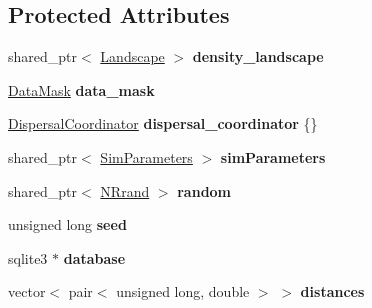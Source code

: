 \subsection*{Protected Attributes}
\begin{DoxyCompactItemize}
\item 
shared\+\_\+ptr$<$ \hyperlink{class_landscape}{Landscape} $>$ {\bfseries density\+\_\+landscape}\hypertarget{class_simulate_dispersal_af69dbb932efef10441d1acf219416c0f}{}\label{class_simulate_dispersal_af69dbb932efef10441d1acf219416c0f}

\item 
\hyperlink{class_data_mask}{Data\+Mask} {\bfseries data\+\_\+mask}\hypertarget{class_simulate_dispersal_a99b4ca8cf3ecbaad85a22c41e5a97a77}{}\label{class_simulate_dispersal_a99b4ca8cf3ecbaad85a22c41e5a97a77}

\item 
\hyperlink{class_dispersal_coordinator}{Dispersal\+Coordinator} {\bfseries dispersal\+\_\+coordinator} \{\}\hypertarget{class_simulate_dispersal_a55da369d57d854168ff6e851b0d7892a}{}\label{class_simulate_dispersal_a55da369d57d854168ff6e851b0d7892a}

\item 
shared\+\_\+ptr$<$ \hyperlink{struct_sim_parameters}{Sim\+Parameters} $>$ {\bfseries sim\+Parameters}\hypertarget{class_simulate_dispersal_abe4c7cc163059093528c621cc7bd041e}{}\label{class_simulate_dispersal_abe4c7cc163059093528c621cc7bd041e}

\item 
shared\+\_\+ptr$<$ \hyperlink{class_n_rrand}{N\+Rrand} $>$ {\bfseries random}\hypertarget{class_simulate_dispersal_a1b66ec7506a0cadab13f802de2d4d2c2}{}\label{class_simulate_dispersal_a1b66ec7506a0cadab13f802de2d4d2c2}

\item 
unsigned long {\bfseries seed}\hypertarget{class_simulate_dispersal_af9ab2fa8b2c3e1bb1ba49b31679ae0d7}{}\label{class_simulate_dispersal_af9ab2fa8b2c3e1bb1ba49b31679ae0d7}

\item 
sqlite3 $\ast$ {\bfseries database}\hypertarget{class_simulate_dispersal_afd3f96f169715aacbcc2939614a6a910}{}\label{class_simulate_dispersal_afd3f96f169715aacbcc2939614a6a910}

\item 
vector$<$ pair$<$ unsigned long, double $>$ $>$ {\bfseries distances}\hypertarget{class_simulate_dispersal_a87359ce728efca1ece43f52c7aa4ce9c}{}\label{class_simulate_dispersal_a87359ce728efca1ece43f52c7aa4ce9c}


\end{DoxyCompactItemize}
